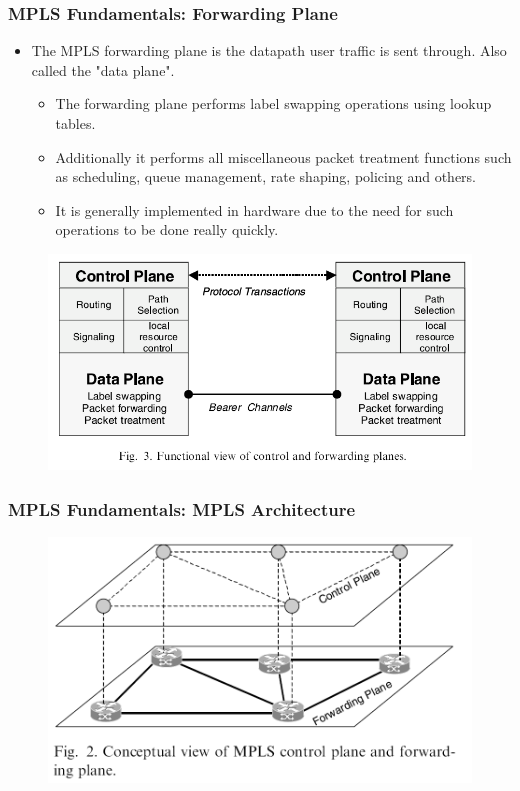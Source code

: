 \documentclass[12pt]{beamer}
\begin{document}
\begin{frame}
  \frametitle{MPLS Fundamentals: Forwarding Plane}
  \begin{itemize}
    \item The MPLS forwarding plane is the datapath user traffic is sent through. Also called the "data plane".
    \begin{itemize}
      \item The forwarding plane performs label swapping operations using lookup tables.
      \item Additionally it performs all miscellaneous packet treatment functions such as scheduling, queue management, rate shaping, policing and others.
      \item It is generally implemented in hardware due to the need for such operations to be done really quickly.
    \end{itemize}
  \end{itemize}
  \begin{figure}[h]
    \begin{center}
      \includegraphics[scale=0.35]{label.png}
    \end{center}
  \end{figure}    
\end{frame}

\begin{frame}
  \frametitle{MPLS Fundamentals: MPLS Architecture}
  \begin{figure}[h]
    \begin{center}
      \includegraphics[scale=0.40]{separation.png}
    \end{center}
  \end{figure}
\end{frame}
\end{document}
